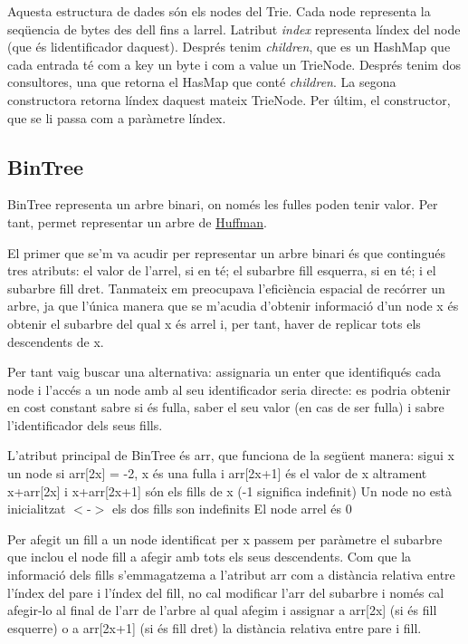 Aquesta estructura de dades són els nodes del Trie. Cada node representa la seqüencia de bytes des d\textquotesingle{}ell fins a l\textquotesingle{}arrel. L\textquotesingle{}atribut {\itshape index} representa l\textquotesingle{}índex del node (que és l\textquotesingle{}identificador d\textquotesingle{}aquest). Després tenim {\itshape children}, que es un Hash\+Map que cada entrada té com a key un byte i com a value un Trie\+Node. Després tenim dos consultores, una que retorna el Has\+Map que conté {\itshape children}. La segona constructora retorna l\textquotesingle{}índex d\textquotesingle{}aquest mateix Trie\+Node. Per últim, el constructor, que se li passa com a paràmetre l\textquotesingle{}índex.

\subsection*{Bin\+Tree}

Bin\+Tree representa un arbre binari, on només les fulles poden tenir valor. Per tant, permet representar un arbre de \hyperlink{classHuffman}{Huffman}.

El primer que se’m va acudir per representar un arbre binari és que contingués tres atributs\+: el valor de l’arrel, si en té; el subarbre fill esquerra, si en té; i el subarbre fill dret. Tanmateix em preocupava l’eficiència espacial de recórrer un arbre, ja que l’única manera que se m’acudia d’obtenir informació d’un node x és obtenir el subarbre del qual x és arrel i, per tant, haver de replicar tots els descendents de x.

Per tant vaig buscar una alternativa\+: assignaria un enter que identifiqués cada node i l’accés a un node amb al seu identificador seria directe\+: es podria obtenir en cost constant sabre si és fulla, saber el seu valor (en cas de ser fulla) i sabre l’identificador dels seus fills.

L’atribut principal de Bin\+Tree és arr, que funciona de la següent manera\+: sigui x un node si arr\mbox{[}2x\mbox{]} = -\/2, x és una fulla i arr\mbox{[}2x+1\mbox{]} és el valor de x altrament x+arr\mbox{[}2x\mbox{]} i x+arr\mbox{[}2x+1\mbox{]} són els fills de x (-\/1 significa indefinit) Un node no està inicialitzat $<$-\/$>$ els dos fills son indefinits El node arrel és 0

Per afegit un fill a un node identificat per x passem per paràmetre el subarbre que inclou el node fill a afegir amb tots els seus descendents. Com que la informació dels fills s’emmagatzema a l’atribut arr com a distància relativa entre l’índex del pare i l’índex del fill, no cal modificar l’arr del subarbre i només cal afegir-\/lo al final de l’arr de l’arbre al qual afegim i assignar a arr\mbox{[}2x\mbox{]} (si és fill esquerre) o a arr\mbox{[}2x+1\mbox{]} (si és fill dret) la distància relativa entre pare i fill.

